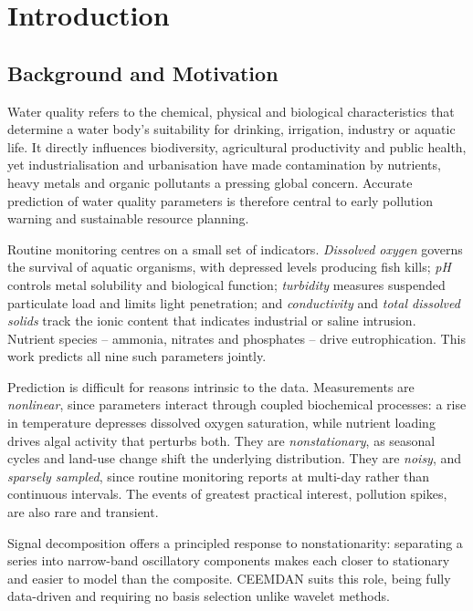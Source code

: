 \documentclass[conference]{IEEEtran}
\begin{document}
\section{Introduction}

\subsection{Background and Motivation}

Water quality refers to the chemical, physical and biological characteristics
that determine a water body's suitability for drinking, irrigation, industry or
aquatic life. It directly influences biodiversity, agricultural productivity and
public health, yet industrialisation and urbanisation have made contamination by
nutrients, heavy metals and organic pollutants a pressing global concern.
Accurate prediction of water quality parameters is therefore central to early
pollution warning and sustainable resource planning.

Routine monitoring centres on a small set of indicators. \emph{Dissolved
oxygen} governs the survival of aquatic organisms, with depressed levels
producing fish kills; \emph{pH} controls metal solubility and biological
function; \emph{turbidity} measures suspended particulate load and limits light
penetration; and \emph{conductivity} and \emph{total dissolved solids} track
the ionic content that indicates industrial or saline intrusion. Nutrient
species -- ammonia, nitrates and phosphates -- drive eutrophication. This work
predicts all nine such parameters jointly.

Prediction is difficult for reasons intrinsic to the data. Measurements are \emph{nonlinear}, since parameters interact through
coupled biochemical processes: a rise in temperature depresses dissolved oxygen
saturation, while nutrient loading drives algal activity that perturbs both.
They are \emph{nonstationary}, as seasonal cycles and land-use change shift the
underlying distribution. They are \emph{noisy}, and \emph{sparsely sampled},
since routine monitoring reports at multi-day rather than continuous intervals.
The events of greatest practical interest, pollution spikes, are also rare and
transient.

Signal decomposition offers a principled response to nonstationarity:
separating a series into narrow-band oscillatory components makes each closer
to stationary and easier to model than the composite. CEEMDAN suits this role,
being fully data-driven and requiring no basis selection unlike wavelet
methods.
\end{document}
